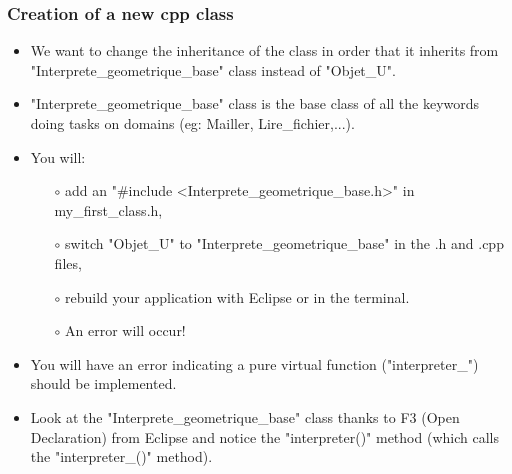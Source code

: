 \documentclass[10pt, hyperref={unicode=true,pdfusetitle, bookmarks=true,bookmarksnumbered=false,bookmarksopen=false, breaklinks=false,pdfborder={0 0 1},backref=true,colorlinks=true,linkcolor=darkblue,pageanchor, urlcolor=darkblue}]{beamer}
\begin{document}
\begin{frame}
\frametitle{Creation of a new cpp class}
\begin{block}{}
\begin{itemize}
\item We want to change the inheritance of the class in order that it inherits from "Interprete\_geometrique\_base" class
instead of "Objet\_U".

\item "Interprete\_geometrique\_base" class is the base class of all the keywords doing tasks on domains (eg: Mailler, Lire\_fichier,...).

\item You will:
    \begin{itemize}
    \item [$\circ$] add an "\#include <Interprete\_geometrique\_base.h>" in my\_first\_class.h,
    \item [$\circ$] switch "Objet\_U" to "Interprete\_geometrique\_base" in the .h and .cpp files,
    \item [$\circ$] rebuild your application with Eclipse or in the terminal.\\
    \item [$\circ$] An error will occur!
    \end{itemize}

\item You will have an error indicating a pure virtual function ("interpreter\_") should be implemented.

\item Look at the "Interprete\_geometrique\_base" class thanks to F3 (Open Declaration)
from Eclipse and notice the "interpreter()" method (which calls the "interpreter\_()" method).\\
\end{itemize}
\end{block}
\end{frame}
\end{document}
